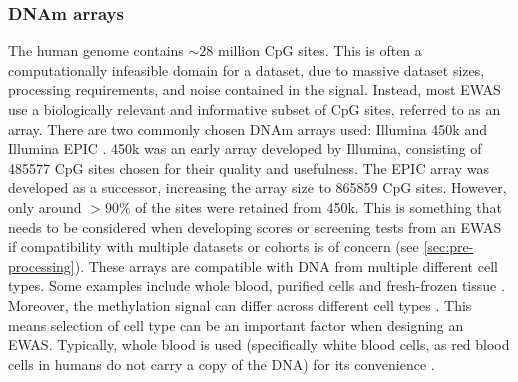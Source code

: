 \documentclass{article} %
\begin{document}
\subsubsection{DNAm arrays}
The human genome contains \(\sim\!28\) million CpG sites. This is often a computationally infeasible domain for a dataset, due to massive dataset sizes, processing requirements, and noise contained in the signal. Instead, most EWAS use a biologically relevant and informative subset of CpG sites, referred to as an array. There are two commonly chosen DNAm arrays used: Illumina 450k \cite{illumina2012methylation450} and Illumina EPIC \cite{illumina2015methylationepic}. 450k was an early array developed by Illumina, consisting of \num{485577} CpG sites chosen for their quality and usefulness. The EPIC array was developed as a successor, increasing the array size to \num{865859} CpG sites. However, only around \(>90\%\) of the sites were retained from 450k. This is something that needs to be considered when developing scores or screening tests from an EWAS if compatibility with multiple datasets or cohorts is of concern (see \ref{sec:pre-processing}). These arrays are compatible with DNA from multiple different cell types. Some examples include whole blood, purified cells and fresh-frozen tissue \cite{bhat2022data}. Moreover, the methylation signal can differ across different cell types \cite{huang2016epigenome}. This means selection of cell type can be an important factor when designing an EWAS. Typically, whole blood is used (specifically white blood cells, as red blood cells in humans do not carry a copy of the DNA) for its convenience \cite{houseman2015dna}.

\end{document}
